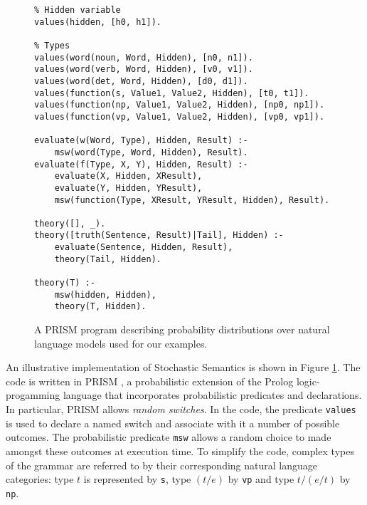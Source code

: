 \documentclass[manuscript]{clv2}
\begin{document}
\begin{figure}
\centering
\begin{lstlisting}
% Hidden variable
values(hidden, [h0, h1]).

% Types
values(word(noun, Word, Hidden), [n0, n1]).
values(word(verb, Word, Hidden), [v0, v1]).
values(word(det, Word, Hidden), [d0, d1]).
values(function(s, Value1, Value2, Hidden), [t0, t1]).
values(function(np, Value1, Value2, Hidden), [np0, np1]).
values(function(vp, Value1, Value2, Hidden), [vp0, vp1]).

evaluate(w(Word, Type), Hidden, Result) :-
	msw(word(Type, Word, Hidden), Result).
evaluate(f(Type, X, Y), Hidden, Result) :-
	evaluate(X, Hidden, XResult),
	evaluate(Y, Hidden, YResult),
	msw(function(Type, XResult, YResult, Hidden), Result).

theory([], _).
theory([truth(Sentence, Result)|Tail], Hidden) :-
	evaluate(Sentence, Hidden, Result),
	theory(Tail, Hidden).

theory(T) :-
	msw(hidden, Hidden),
	theory(T, Hidden).
\end{lstlisting}
\caption{A PRISM program describing probability distributions over
  natural language models used for our examples.}
\label{figure:program}
\end{figure}





An illustrative implementation of Stochastic Semantics is shown in Figure \ref{figure:program}. The code is written in PRISM  \cite{Sato:97}, a probabilistic extension of the Prolog logic-progamming language that incorporates probabilistic predicates and declarations. In particular, PRISM allows {\em random switches}. In the code, the predicate \texttt{values} is used to declare a named switch and associate with it a number of possible outcomes. The probabilistic predicate \texttt{msw} allows a random choice to made amongst these outcomes at execution time. To simplify the code, complex types of the grammar are referred to by their corresponding natural language
categories: type $t$ is represented by \texttt{s}, type $(t/e)$ by \texttt{vp} and type $t/(e/t)$ by \texttt{np}. 
\end{document}
